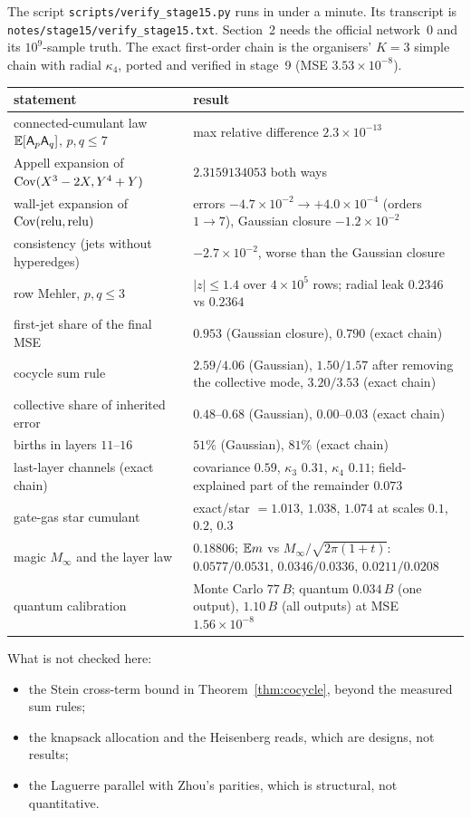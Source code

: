 \label{sec:verify}
The script \texttt{scripts/\allowbreak verify\_\allowbreak stage15.py} runs in under a minute. Its transcript is
\texttt{notes/\allowbreak stage15/\allowbreak verify\_\allowbreak stage15.txt}. Section~2 needs
the official network~0 and its $10^9$-sample truth. The exact first-order chain is the organisers' $K=3$ simple chain with radial
$\kappa_4$, ported and verified in stage~9 (MSE $3.53\times10^{-8}$).
\begin{center}\small
\begin{tabular}{>{\raggedright\arraybackslash}p{5.2cm}>{\raggedright\arraybackslash}p{8.8cm}}\toprule
statement & result\\\midrule
connected-cumulant law $\mathbb E[\mathsf A_p\mathsf A_q]$, $p,q\le7$ & max relative difference $2.3\times10^{-13}$\\
Appell expansion of $\operatorname{Cov}(X^3-2X,Y^4+Y)$ & $2.3159134053$ both ways\\
wall-jet expansion of $\operatorname{Cov}(\operatorname{relu},\operatorname{relu})$ & errors $-4.7\times10^{-2}\to+4.0\times10^{-4}$ (orders $1\to7$), Gaussian closure $-1.2\times10^{-2}$\\
consistency (jets without hyperedges) & $-2.7\times10^{-2}$, worse than the Gaussian closure\\
row Mehler, $p,q\le3$ & $|z|\le1.4$ over $4\times10^5$ rows; radial leak $0.2346$ vs $0.2364$\\
first-jet share of the final MSE & $0.953$ (Gaussian closure), $0.790$ (exact chain)\\
cocycle sum rule & $2.59/4.06$ (Gaussian), $1.50/1.57$ after removing the collective mode, $3.20/3.53$ (exact chain)\\
collective share of inherited error & $0.48$--$0.68$ (Gaussian), $0.00$--$0.03$ (exact chain)\\
births in layers $11$--$16$ & $51\%$ (Gaussian), $81\%$ (exact chain)\\
last-layer channels (exact chain) & covariance $0.59$, $\kappa_3$ $0.31$, $\kappa_4$ $0.11$; field-explained part of the remainder $0.073$\\
gate-gas star cumulant & exact/star $=1.013$, $1.038$, $1.074$ at scales $0.1$, $0.2$, $0.3$\\
magic $M_\infty$ and the layer law & $0.18806$; $\mathbb E m$ vs $M_\infty/\sqrt{2\pi(1+t)}$: $0.0577/0.0531$, $0.0346/0.0336$, $0.0211/0.0208$\\
quantum calibration & Monte Carlo $77\,B$; quantum $0.034\,B$ (one output), $1.10\,B$ (all outputs) at MSE $1.56\times10^{-8}$\\\bottomrule
\end{tabular}
\end{center}
What is not checked here:
\begin{itemize}[leftmargin=*]
\item the Stein cross-term bound in Theorem~\ref{thm:cocycle}, beyond the measured sum rules;
\item the knapsack allocation and the Heisenberg reads, which are designs, not results;
\item the Laguerre parallel with Zhou's parities, which is structural, not quantitative.
\end{itemize}
